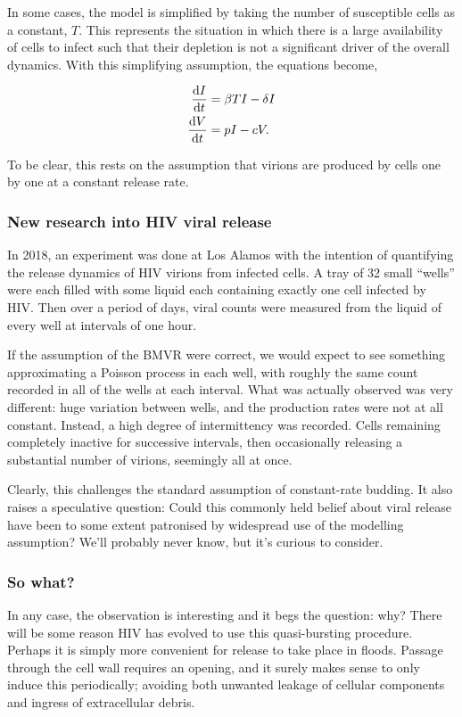 \noindent
In some cases, the model is simplified by taking the number of susceptible cells as a constant, $T$. This represents the situation in which there is a large availability of cells to infect such that their depletion is not a significant driver of the overall dynamics. With this simplifying assumption, the equations become,

\begin{align*}
\frac{\mathrm{d}I}{\mathrm{d}t} & = \beta TI - \delta I\\
\frac{\mathrm{d}V}{\mathrm{d}t}& = p I - c V.
\end{align*}

\noindent
To be clear, this rests on the assumption that virions are produced by cells one by one at a constant release rate.


\subsubsection*{New research into HIV viral release}

In 2018, an experiment was done at Los Alamos \cite{hataye2019principles} with the intention of quantifying the release dynamics of HIV virions from infected cells. A tray of 32 small ``wells'' were each filled with some liquid each containing exactly one cell infected by HIV. Then over a period of days, viral counts were measured from the liquid of every well at intervals of one hour.\par

If the assumption of the BMVR were correct, we would expect to see something approximating a Poisson process in each well, with roughly the same count recorded in all of the wells at each interval. What was actually observed was very different: huge variation between wells, and the production rates were not at all constant. Instead, a high degree of intermittency was recorded. Cells remaining completely inactive for successive intervals, then occasionally releasing a substantial number of virions, seemingly all at once. \par

Clearly, this challenges the standard assumption of constant-rate budding. It also raises a speculative question: Could this commonly held belief about viral release have been to some extent patronised by widespread use of the modelling assumption? We'll probably never know, but it's curious to consider.\par

\subsubsection*{So what?}
In any case, the observation is interesting and it begs the question: why? There will be some reason HIV has evolved to use this quasi-bursting procedure. Perhaps it is simply more convenient for release to take place in floods. Passage through the cell wall requires an opening, and it surely makes sense to only induce this periodically; avoiding both unwanted leakage of cellular components and ingress of extracellular debris.\par 

